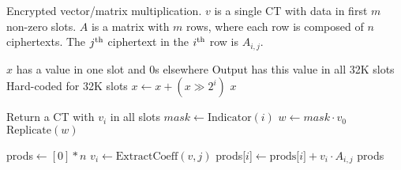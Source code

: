 \documentclass{article}
\begin{document}
	\begin{algorithm}
		\caption{Encrypted vector/matrix multiplication. $v$ is a single CT with data in first $m$ non-zero slots. $A$ is a matrix with $m$ rows, where each row is composed of $n$ ciphertexts. The $j^{\mathrm{th}}$ ciphertext in the $i^{\mathrm{th}}$ row is $A_{i,j}$.}\label{alg:dotprod}
		\begin{algorithmic}[1]
			\Comment $x$ has a value in one slot and 0s elsewhere
			\State \Comment Output has this value in all 32K slots
			\Comment Hard-coded for 32K slots
			  \State $x \gets x + (x \gg 2^i)$
			\EndFor
			\State \Return $x$
			\EndProcedure
			\State
			
			\Comment Return a CT with $v_i$ in all slots
			\State $mask\gets \mathrm{Indicator}(i)$
			\State $w\gets mask \cdot v_0$
			\State \Return $\mathrm{Replicate}(w)$
			\EndProcedure
			\State
			
			\State prods$ \gets [0]*n$
			  \State $v_i\gets \mathrm{ExtractCoeff}(v, j)$
			    \State prods[$i$]$ \gets \mathrm{prods[}i\mathrm{]} + v_i\cdot A_{i, j}$
			  \EndFor
			\EndFor			
			\State \Return prods
			\EndProcedure
		\end{algorithmic}
	\end{algorithm}
	
\end{document}
